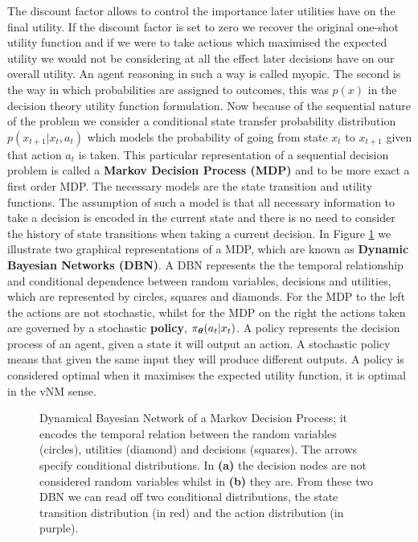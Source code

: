 The discount factor allows to control the importance later utilities have on the final utility. If the discount factor is set to
zero we recover the original one-shot utility function and if we were to take actions which maximised the expected utility 
we would not be considering at all the effect later decisions have on our overall utility. An agent reasoning in such a way is 
called myopic.
The second is the way in which probabilities are assigned to outcomes, this was $p(x)$ in the decision theory utility function formulation.
Now because of the sequential nature of the problem we consider a conditional state transfer probability distribution $p(x_{t+1}|x_t,a_t)$
which models the probability of going from state $x_t$ to $x_{t+1}$ given that action $a_t$ is taken. This particular representation of a
sequential decision problem is called a \textbf{Markov Decision Process (MDP)} and to be more exact a first order MDP.
The necessary models are the state transition and utility functions. The assumption of such a model is that all necessary information to 
take a decision is encoded in the current state and there is no need to consider the history of state transitions when taking a current decision.
In Figure \ref{fig:mdp} we illustrate two graphical representations of a MDP, which are known as \textbf{Dynamic Bayesian Networks (DBN)}.
A DBN represents the the temporal relationship and conditional dependence between random variables, decisions and utilities, which are 
represented by circles, squares and diamonds. For the MDP to the left the actions are not stochastic, whilst for the MDP on the right 
the actions taken are governed by a stochastic \textbf{policy}, $\operatorname{\pi_{\boldsymbol{\theta}}}(a_t|x_t)$. A policy represents the decision process of an agent,
given a state it will output an action. A stochastic policy means that given the same input they will produce
different outputs. A policy is considered optimal when it maximises the expected utility function, it is optimal in the vNM sense.

\begin{figure}[h]
  \centering
  \caption{Dynamical Bayesian Network of a Markov Decision Process; it encodes the temporal relation between the random variables (circles),
  utilities (diamond) and decisions (squares). The arrows specify conditional distributions. In \textbf{(a)} the decision nodes are not considered 
  random variables whilst in \textbf{(b)} they are. From these two DBN  we can read off two conditional distributions, the state transition distribution (in red) and the action distribution (in purple). }
    \label{fig:mdp}
\end{figure}

